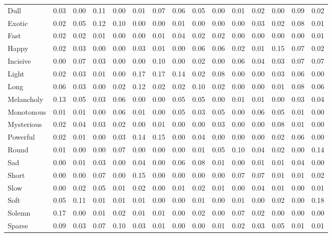\documentclass[
]{article}
\newenvironment{lltable}{\begin{landscape}\begin{center}\begin{ThreePartTable}}{\end{ThreePartTable}\end{center}\end{landscape}}
\begin{document}
\begin{lltable}
{\begin{longtable}{lllllllllllllll}
Dull & 0.03 & 0.00 & 0.11 & 0.00 & 0.01 & 0.07 & 0.06 & 0.05 & 0.00 & 0.01 & 0.02 & 0.00 & 0.09 & 0.02\\
Exotic & 0.02 & 0.05 & 0.12 & 0.10 & 0.00 & 0.00 & 0.01 & 0.00 & 0.00 & 0.00 & 0.03 & 0.02 & 0.08 & 0.01\\
Fast & 0.02 & 0.02 & 0.01 & 0.00 & 0.00 & 0.01 & 0.04 & 0.02 & 0.02 & 0.00 & 0.00 & 0.00 & 0.00 & 0.01\\
Happy & 0.02 & 0.03 & 0.00 & 0.00 & 0.03 & 0.01 & 0.00 & 0.06 & 0.06 & 0.02 & 0.01 & 0.15 & 0.07 & 0.02\\
Incisive & 0.00 & 0.07 & 0.03 & 0.00 & 0.00 & 0.10 & 0.00 & 0.02 & 0.00 & 0.06 & 0.04 & 0.03 & 0.07 & 0.07\\
Light & 0.02 & 0.03 & 0.01 & 0.00 & 0.17 & 0.17 & 0.14 & 0.02 & 0.08 & 0.00 & 0.00 & 0.03 & 0.06 & 0.00\\
Long & 0.06 & 0.03 & 0.00 & 0.02 & 0.12 & 0.02 & 0.02 & 0.10 & 0.02 & 0.00 & 0.00 & 0.01 & 0.08 & 0.06\\
Melancholy & 0.13 & 0.05 & 0.03 & 0.06 & 0.00 & 0.00 & 0.05 & 0.05 & 0.00 & 0.01 & 0.01 & 0.00 & 0.03 & 0.04\\
Monotonous & 0.01 & 0.01 & 0.00 & 0.06 & 0.01 & 0.00 & 0.05 & 0.03 & 0.05 & 0.00 & 0.06 & 0.05 & 0.01 & 0.00\\
Mysterious & 0.02 & 0.04 & 0.03 & 0.02 & 0.00 & 0.01 & 0.00 & 0.00 & 0.03 & 0.00 & 0.00 & 0.08 & 0.01 & 0.00\\
Powerful & 0.02 & 0.01 & 0.00 & 0.03 & 0.14 & 0.15 & 0.00 & 0.04 & 0.00 & 0.00 & 0.00 & 0.02 & 0.06 & 0.00\\
Round & 0.01 & 0.00 & 0.00 & 0.07 & 0.00 & 0.00 & 0.00 & 0.01 & 0.05 & 0.10 & 0.04 & 0.02 & 0.00 & 0.14\\
Sad & 0.00 & 0.01 & 0.03 & 0.00 & 0.04 & 0.00 & 0.06 & 0.08 & 0.01 & 0.00 & 0.01 & 0.01 & 0.04 & 0.00\\
Short & 0.00 & 0.00 & 0.07 & 0.00 & 0.15 & 0.00 & 0.00 & 0.00 & 0.00 & 0.07 & 0.07 & 0.01 & 0.01 & 0.02\\
Slow & 0.00 & 0.02 & 0.05 & 0.01 & 0.02 & 0.00 & 0.01 & 0.02 & 0.01 & 0.00 & 0.04 & 0.01 & 0.00 & 0.01\\
Soft & 0.05 & 0.11 & 0.01 & 0.01 & 0.01 & 0.00 & 0.00 & 0.01 & 0.00 & 0.01 & 0.00 & 0.02 & 0.00 & 0.18\\
Solemn & 0.17 & 0.00 & 0.01 & 0.02 & 0.01 & 0.01 & 0.00 & 0.02 & 0.00 & 0.07 & 0.02 & 0.00 & 0.00 & 0.00\\
Sparse & 0.09 & 0.03 & 0.07 & 0.10 & 0.03 & 0.01 & 0.00 & 0.00 & 0.01 & 0.02 & 0.03 & 0.05 & 0.01 & 0.01\\

\end{longtable}}
\end{lltable}
\end{document}
